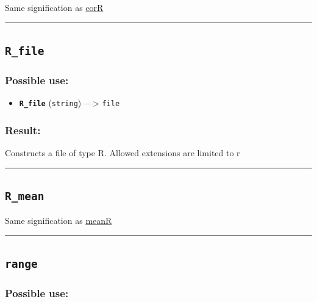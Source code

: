 \documentclass[]{book}
\providecommand{\tightlist}{%
  \setlength{\itemsep}{0pt}\setlength{\parskip}{0pt}}
\theoremstyle{definition}
\theoremstyle{definition}
\theoremstyle{definition}
\theoremstyle{remark}
\begin{document}
Same signification as \href{operators-b-to-c.html\#corR}{corR}

\begin{center}\rule{0.5\linewidth}{\linethickness}\end{center}

\subsection{\texorpdfstring{\texttt{R\_file}}{R\_file}}\label{r_file}

\subsubsection{Possible use:}\label{possible-use-426}

\begin{itemize}
\tightlist
\item
  \textbf{\texttt{R\_file}} (\texttt{string}) ---\textgreater{}
  \texttt{file}
\end{itemize}

\subsubsection{Result:}\label{result-412}

Constructs a file of type R. Allowed extensions are limited to r

\begin{center}\rule{0.5\linewidth}{\linethickness}\end{center}

\subsection{\texorpdfstring{\texttt{R\_mean}}{R\_mean}}\label{r_mean}

Same signification as \href{operators-i-to-m.html\#meanR}{meanR}

\begin{center}\rule{0.5\linewidth}{\linethickness}\end{center}

\subsection{\texorpdfstring{\texttt{range}}{range}}\label{range}

\subsubsection{Possible use:}\label{possible-use-427}
\end{document}
